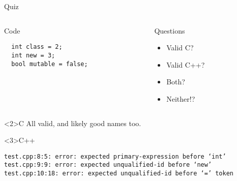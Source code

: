 \documentclass[presentation,aspectratio=169]{beamer}
\begin{document}

\begin{frame}[fragile,label={sec:org23c4234}]{Quiz}
\begin{columns}
\begin{column}{0.48\columnwidth}
\begin{block}{Code}
\begin{verbatim}
  int class = 2;
  int new = 3;
  bool mutable = false;
\end{verbatim}
\end{block}
\end{column}

\begin{column}{0.48\columnwidth}
\begin{block}{Questions}
\begin{itemize}
\item Valid C?
\item Valid C++?
\item Both?
\item Neither!?
\end{itemize}
\end{block}
\end{column}
\end{columns}

\begin{block}<2>{C}
All valid, and likely good names too.
\end{block}

\vspace{-1cm}
\begin{block}<3>{C++}
\begin{verbatim}
test.cpp:8:5: error: expected primary-expression before ‘int’
test.cpp:9:9: error: expected unqualified-id before ‘new’
test.cpp:10:18: error: expected unqualified-id before ‘=’ token
\end{verbatim}
\end{block}
\end{frame}

\end{document}
